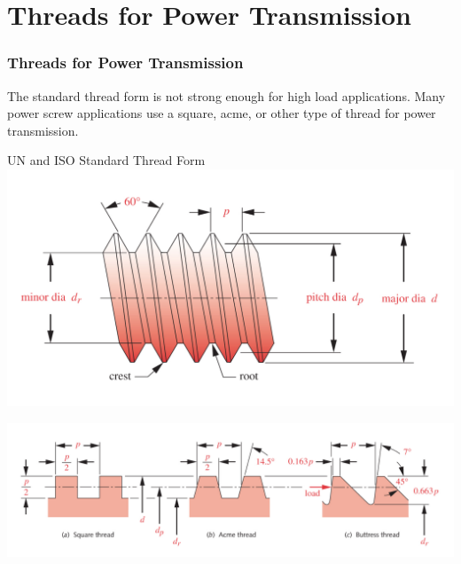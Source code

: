 \documentclass[fleqn]{beamer} %
\newcommand{\sectiontitleII}{Threads for Power Transmission}
\begin{document}
\section{\sectiontitleII}	

	\begin{frame}[label=sectionII] \small
		\frametitle{\sectiontitleII}

		
		\begin{multicols}{2}
		The standard thread form is not strong enough for high load applications. Many power screw applications use a square, acme, or other type of thread for power transmission. \vspace{10mm}

		UN and ISO Standard Thread Form
		\includegraphics[scale=.1]{images/figure_15_2.png}
		\end{multicols}	

		\includegraphics[scale=.15]{images/figure_15_3.png}	

	\end{frame}
\end{document}
